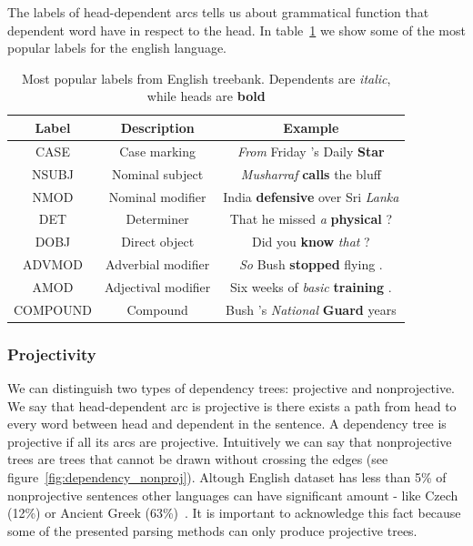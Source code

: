 The labels of head-dependent arcs tells us about grammatical function that
dependent word have in respect to the head. In table~\ref{tab:label_samples}
we show some of the most popular labels for the english language.

\begin{table}[!htbp]
    \centering
    \begin{tabular}{c | c | c}
        Label & Description & Example \\ \hline\hline
        CASE & Case marking & \textit{From} Friday 's Daily \textbf{Star} \\
        NSUBJ & Nominal subject & \textit{Musharraf} \textbf{calls} the bluff \\
        NMOD & Nominal modifier & India \textbf{defensive} over Sri \textit{Lanka} \\
        DET & Determiner & That he missed \textit{a} \textbf{physical} ? \\
        DOBJ & Direct object & Did you \textbf{know} \textit{that} ? \\
        ADVMOD & Adverbial modifier & \textit{So} Bush \textbf{stopped} flying . \\
        AMOD & Adjectival modifier & Six weeks of \textit{basic} \textbf{training} . \\
        COMPOUND & Compound & Bush 's \textit{National} \textbf{Guard} years
    \end{tabular}
    \caption{Most popular labels from English treebank. Dependents are \textit{italic},
    while heads are \textbf{bold}}
    \label{tab:label_samples}
\end{table}

\subsubsection{Projectivity}
We can distinguish two types of dependency trees: projective and nonprojective.
We say that head-dependent arc is projective is there exists a path from head
to every word between head and dependent in the sentence. A dependency tree is
projective if all its arcs are projective.
Intuitively we can say that nonprojective trees are trees that cannot be drawn
without crossing the edges (see figure~\ref{fig:dependency_nonproj}).
Altough English dataset has less than 5\% of nonprojective sentences other
languages can have significant amount - like Czech (12\%) or Ancient Greek (63\%)~\cite{straka_parsing_2015}.
It is important to acknowledge this fact because some of the presented parsing
methods can only produce projective trees.

